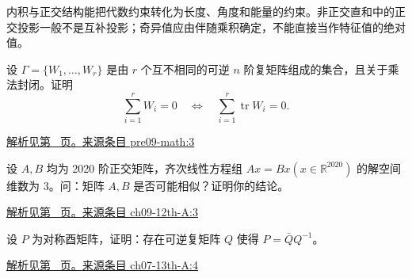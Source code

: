 \documentclass[12pt,fontset=fandol]{ctexart}
\begin{document}
\label{sec:questions-8}

内积与正交结构能把代数约束转化为长度、角度和能量的约束。非正交直和中的正交投影一般不是互补投影；奇异值应由伴随乘积确定，不能直接当作特征值的绝对值。

\begin{example}\label{ex:pre09-math:3}

设 $\Gamma=\{W_1,\ldots,W_r\}$ 是由 $r$ 个互不相同的可逆 $n$ 阶复矩阵组成的集合，且关于乘法封闭。证明
\[
\sum_{i=1}^rW_i=0\quad\Longleftrightarrow\quad
\sum_{i=1}^r\operatorname{tr}W_i=0.
\]

\par\hyperref[ans:pre09-math:3]{解析见第~\pageref{ans:pre09-math:3} 页。}\quad\href{https://github.com/lzxcr/cmc-mathematics/blob/64916fa1fdbc3e444a652eca204d5669058ee321/src/problems/preliminary/09/03.md}{来源条目 pre09-math:3}

\end{example}

\begin{example}\label{ex:ch09-12th-A:3}

设 $A,B$ 均为 2020 阶正交矩阵，齐次线性方程组 $Ax=Bx\left(x\in\mathbb{R}^{2020}\right)$ 的解空间维数为 3。问：矩阵 $A,B$ 是否可能相似？证明你的结论。

\par\hyperref[ans:ch09-12th-A:3]{解析见第~\pageref{ans:ch09-12th-A:3} 页。}\quad\href{https://github.com/lzxcr/cmc-mathematics/blob/64916fa1fdbc3e444a652eca204d5669058ee321/src/problems/preliminary/12/03.md}{来源条目 ch09-12th-A:3}

\end{example}

\begin{example}\label{ex:ch07-13th-A:4}

设 $P$ 为对称酉矩阵，证明：存在可逆复矩阵 $Q$ 使得 $P=\bar{Q}Q^{-1}$。

\par\hyperref[ans:ch07-13th-A:4]{解析见第~\pageref{ans:ch07-13th-A:4} 页。}\quad\href{https://github.com/lzxcr/cmc-mathematics/blob/64916fa1fdbc3e444a652eca204d5669058ee321/src/problems/preliminary/13/04.md}{来源条目 ch07-13th-A:4}

\end{example}
\end{document}
